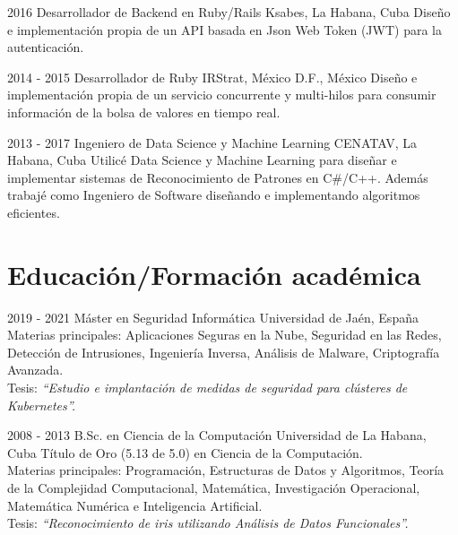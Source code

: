 \documentclass[]{friggeri-cv}
\begin{document}
\begin{entrylist}
  \entry
    {2016}
    {Desarrollador de Backend en Ruby/Rails}
    {Ksabes, La Habana, Cuba}
    {Diseño e implementación propia de un API basada en Json Web Token (JWT) para la autenticación.\\}

  \entry
    {2014 - 2015}
    {Desarrollador de Ruby}
    {IRStrat, México D.F., México}
    {Diseño e implementación propia de un servicio concurrente y multi-hilos para consumir información de la bolsa de valores en tiempo real.\\}

  \entry
    {2013 - 2017}
    {Ingeniero de Data Science y Machine Learning}
    {CENATAV, La Habana, Cuba}
    {Utilicé Data Science y Machine Learning para diseñar e implementar sistemas de Reconocimiento de Patrones en C\#/C++. Además trabajé como Ingeniero de Software diseñando e implementando algoritmos eficientes.\\}
\end{entrylist}

\section{Educación/Formación académica}
\begin{entrylist}
  \entry
    {2019 - 2021}
    {Máster en Seguridad Informática}
    {Universidad de Jaén, España}
    {
      Materias principales: Aplicaciones Seguras en la Nube, Seguridad en las Redes, Detección de Intrusiones, Ingeniería Inversa, Análisis de Malware, Criptografía Avanzada.\\
      Tesis: \emph{``Estudio e implantación de medidas de seguridad para clústeres de Kubernetes''.}\\
    }

  \entry
    {2008 - 2013}
    {B.Sc. en Ciencia de la Computación}
    {Universidad de La Habana, Cuba}
    {Título de Oro (5.13 de 5.0) en Ciencia de la Computación.\\ Materias principales: Programación, Estructuras de Datos y Algoritmos, Teoría de la Complejidad Computacional, Matemática, Investigación Operacional, Matemática Numérica e Inteligencia Artificial.\\
    Tesis: \emph{``Reconocimiento de iris utilizando Análisis de Datos Funcionales''.}}

\end{entrylist}
\end{document}
